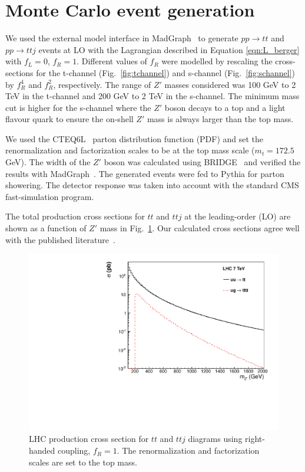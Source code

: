 \section{Monte Carlo event generation}
\label{sec:mc}

We used the external model interface in MadGraph~\cite{madgraph} 
to generate $pp \to tt$ and $pp \to ttj$ events at LO 
with the Lagrangian described in Equation \ref{eqn:L_berger} with $f_L = 0$, $f_R = 1$.  
Different values of $f_R$ were modelled by rescaling the cross-sections
for the t-channel (Fig.~\ref{fig:tchannel}) and s-channel (Fig.~\ref{fig:schannel}) 
by $f_R^4$ and $f_R^2$, respectively.
The range of $Z'$ masses considered was 100 GeV to 2 TeV in the t-channel
and 200 GeV to 2 TeV in the s-channel. 
The minimum mass cut is higher for the s-channel where
the $Z'$ boson decays to a top and a light flavour quark
to ensure the on-shell $Z'$ mass is always  larger than the top mass.

We used the CTEQ6L~\cite{cteq6l} parton distribution function (PDF)
and set the renormalization and factorization scales
to be at the top mass scale ($m_{t} = 172.5$ GeV). 
The width of the $Z'$ boson was calculated using 
BRIDGE~\cite{bridge} and verified the results with MadGraph~\cite{madgraph}. 
The generated events were fed to Pythia for 
parton showering.
The detector response was taken into account with the standard CMS
fast-simulation program.

The total production cross sections for $tt$ and $ttj$ 
at the leading-order (LO) are shown as a function of $Z'$ 
mass in Fig.~\ref{fig:sstopcross}. 
Our calculated cross sections agree well with the 
published literature~\cite{berger}. 

\begin{figure}[htb]
\begin{center}
\includegraphics[width=0.7\linewidth]{figs/sstopcross.pdf}
\caption{ LHC production cross section for $tt$ and $ttj$ diagrams using right-handed coupling, $f_R = 1$. 
The renormalization and factorization scales are set to the top mass. \label{fig:sstopcross}}
\end{center}
\end{figure}